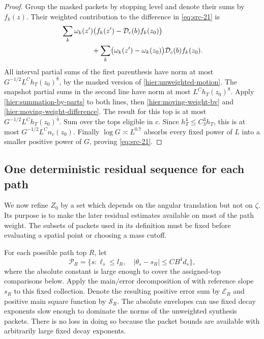 \begin{proof}
Group the masked packets by stopping level and denote their sums by
$f_k(z)$.  Their weighted contribution to the difference in
\eqref{eq:src-21} is
\begin{align*}
 &\sum_k\omega_k(z')
       \bigl(f_k(z')-\mathcal D_c(b)f_k(z_0)\bigr)\\
 &\hspace{15mm}
 +\sum_k\bigl(\omega_k(z')-\omega_k(z_0)\bigr)
                        \mathcal D_c(b)f_k(z_0).
\end{align*}
All interval partial sums of the first parenthesis have norm at most
$G^{-1/2}L^Ch_T(z_0)^8$, by the masked version of
\eqref{hier:unweighted-motion}.  The snapshot partial sums in the second
line have norm at most $L^Ch_T(z_0)^8$.  Apply
\eqref{hier:summation-by-parts} to both lines, then
\eqref{hier:moving-weight-bv} and
\eqref{hier:moving-weight-difference}.  The result for this top is at
most $G^{-1/2}L^Ch_T(z_0)^4$.
Sum over the tops eligible in $c$.  Since $h_T^4\le C_3^3h_T$, this is
at most $G^{-1/2}L^Cn_c(z_0)$.  Finally
$\log G\asymp L^{0.7}$ absorbs every fixed power of $L$ into a smaller
positive power of $G$, proving \eqref{eq:src-21}.
\end{proof}

\subsection{One deterministic residual sequence for each path}

We now refine $Z_0$ by a set which depends on the angular translation but
not on $\zeta$.  Its purpose is to make the later residual estimates
available on most of the path weight.  The subsets of packets used in
its definition must be fixed before evaluating a spatial point or
choosing a mass cutoff.

For each possible path top $R$, let
\begin{equation}
 \mathcal P_R
 =\{s:\ell_s\le l_R,\quad
                    |\theta_s-s_R|\le C B^4d_s\},
 \label{hier:reference-packets}
\end{equation}
where the absolute constant is large enough to cover the assigned-top
comparisons below.  Apply the main/error decomposition of
 with reference slope $s_R$ to this fixed
collection.  Denote the resulting positive error sum by
$\mathcal E_R$ and positive main square function by $\mathcal S_R$.
The absolute envelopes can use fixed decay exponents slow enough to
dominate the norms of the unweighted synthesis packets.  There is no
loss in doing so because the packet bounds are available with arbitrarily
large fixed decay exponents.

